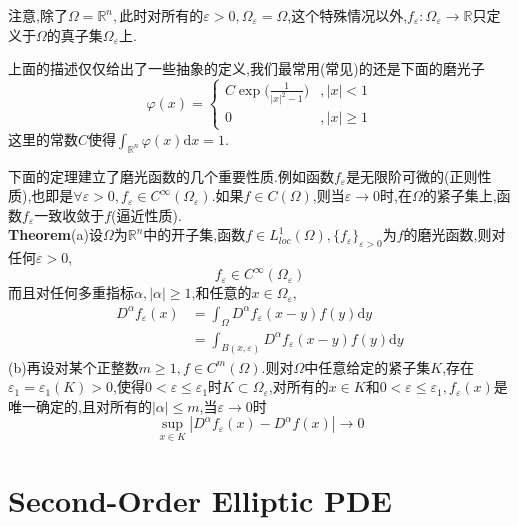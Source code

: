 \documentclass[a4paper,UTF8,12pt]{ctexart}
\begin{document}
注意,除了$\Omega=\mathbb{R}^n,$此时对所有的$\varepsilon >0,\Omega_{\varepsilon}=\Omega$,这个特殊情况以外,$f_{\varepsilon}:\Omega_{\varepsilon}\to\mathbb{R}$只定义于$\Omega$的真子集$\Omega_{\varepsilon}$上.\par
上面的描述仅仅给出了一些抽象的定义,我们最常用(常见)的还是下面的磨光子
$$
\varphi (x)=
\begin{cases}
    C\exp\bigl(\frac{1}{|x|^2-1}\bigr) &,|x|<1\\
    0                        &,|x|\geqslant 1
\end{cases}
$$
这里的常数$C$使得$\int_{\mathbb{R}^n}\varphi (x)\mathrm{d}x=1$.\par
下面的定理建立了磨光函数的几个重要性质.例如函数$f_{\varepsilon}$是无限阶可微的(正则性质),也即是$\forall \varepsilon >0,f_{\varepsilon}\in C^{\infty}(\Omega_{\varepsilon})$.如果$f\in C(\Omega)$,则当$\varepsilon \to 0$时,在$\Omega$的紧子集上,函数$f_{\varepsilon}$一致收敛于$f$(逼近性质).\\
\textbf{Theorem}\quad (a)设$\Omega$为$\mathbb{R}^n$中的开子集,函数$f\in L^1_{loc}(\Omega),\{f_{\varepsilon}\}_{\varepsilon >0}$为$f$的磨光函数,则对任何$\varepsilon >0$,
$$
f_{\varepsilon}\in C^{\infty}(\Omega_{\varepsilon})
$$
而且对任何多重指标$\alpha,|\alpha|\geqslant 1$,和任意的$x\in \Omega_{\varepsilon}$,
$$
\begin{aligned}
    D^{\alpha}f_{\varepsilon}(x) &= \int_{\Omega}D^{\alpha}f_{\varepsilon}(x-y)f(y)\mathrm{d}y\\
                                 &= \int_{B(x,\varepsilon)}D^{\alpha}f_{\varepsilon}(x-y)f(y)\mathrm{d}y
\end{aligned}
$$
\quad \quad (b)再设对某个正整数$m\geqslant 1,f\in C^m(\Omega)$.则对$\Omega$中任意给定的紧子集$K$,存在$\varepsilon_1=\varepsilon_1(K)>0$,使得$0<\varepsilon\leqslant\varepsilon_1$时$K\subset\Omega_{\varepsilon}$,对所有的$x\in K$和$0<\varepsilon\leqslant\varepsilon_1,f_{\varepsilon}(x)$是唯一确定的,且对所有的$|\alpha|\leqslant m$,当$\varepsilon\to 0$时
$$
\sup_{x\in K}| D^{\alpha}f_{\varepsilon}(x)- D^{\alpha}f(x)|\to 0
$$
\section{Second-Order Elliptic PDE}
\end{document}
